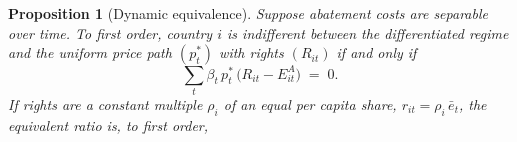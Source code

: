 \documentclass[12pt,english]{article}
\newtheorem{proposition}{Proposition}
\theoremstyle{remark}
\begin{document}
\begin{proposition}[Dynamic equivalence]\label{prop:dynamic}
Suppose abatement costs are separable over time. To first order, country $i$ is indifferent between the differentiated regime and the uniform price path $(p^*_t)$ with rights $(R_{it})$ if and only if
\begin{equation}
  \sum_t \beta_t\,p^*_t\,\bigl(R_{it}-E^A_{it}\bigr) \;=\; 0.
  \label{eq:dyn_equiv}
\end{equation}
If rights are a constant multiple $\rho_i$ of an equal per capita share, $r_{it}=\rho_i\,\bar e_t$, %
the equivalent ratio is, to first order,

\end{proposition}
\end{document}
